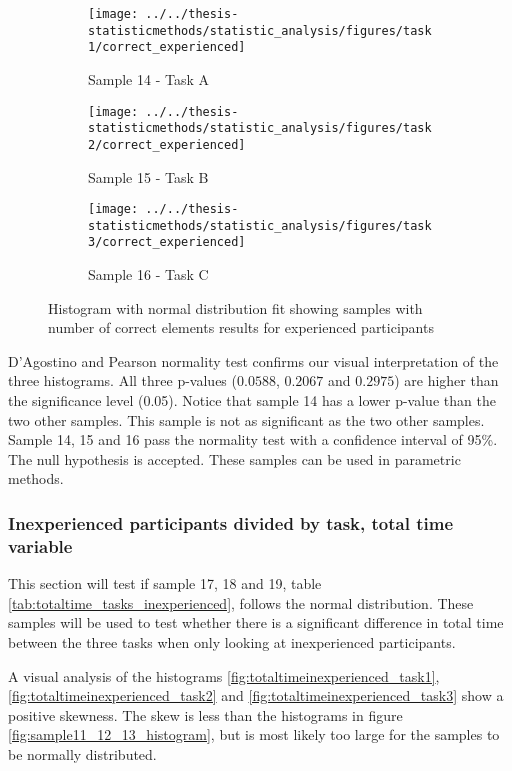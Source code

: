 \begin{figure}[H]
	\centering
	\begin{subfigure}[b]{0.32\textwidth}
		\centering
		\texttt{[image: ../../thesis-statisticmethods/statistic\_analysis/figures/task1/correct\_experienced]}
		\caption{Sample 14 - Task A}
		\label{fig:correctexperienced_task1}
	\end{subfigure}
	\begin{subfigure}[b]{0.32\textwidth}
		\centering
		\texttt{[image: ../../thesis-statisticmethods/statistic\_analysis/figures/task2/correct\_experienced]}
		\caption{Sample 15 - Task B}
		\label{fig:correctexperienced_task2}
	\end{subfigure}
	\begin{subfigure}[b]{0.32\textwidth}
		\centering
		\texttt{[image: ../../thesis-statisticmethods/statistic\_analysis/figures/task3/correct\_experienced]}
		\caption{Sample 16 - Task C}
		\label{fig:correctexperienced_task3}
	\end{subfigure}
	\caption{Histogram with normal distribution fit showing samples with number of correct elements results for experienced participants}
	\label{fig:sample14,15,16_normhistogram}
\end{figure}

 D'Agostino and Pearson normality test confirms our visual interpretation of the three histograms. All three p-values ($0.0588$, $0.2067$ and $0.2975$) are higher than the significance level (0.05). Notice that sample 14 has a lower p-value than the two other samples. This sample is not as significant as the two other samples. Sample 14, 15 and 16 pass the normality test with a confidence interval of 95\%. The null hypothesis is accepted. These samples can be used in parametric methods. 

\subsubsection[Sample 17, 18 and 19]{Inexperienced participants divided by task, total time variable}\label{sec:sample_17,18,19_normalitytest}
This section will test if sample 17, 18 and 19, table \ref{tab:totaltime_tasks_inexperienced}, follows the normal distribution. These samples will be used to test whether there is a significant difference in total time between the three tasks when only looking at inexperienced participants.

A visual analysis of the histograms \ref{fig:totaltimeinexperienced_task1}, \ref{fig:totaltimeinexperienced_task2} and \ref{fig:totaltimeinexperienced_task3} show a positive skewness. The skew is less than the histograms in figure \ref{fig:sample11_12_13_histogram}, but is most likely too large for the samples to be normally distributed.

